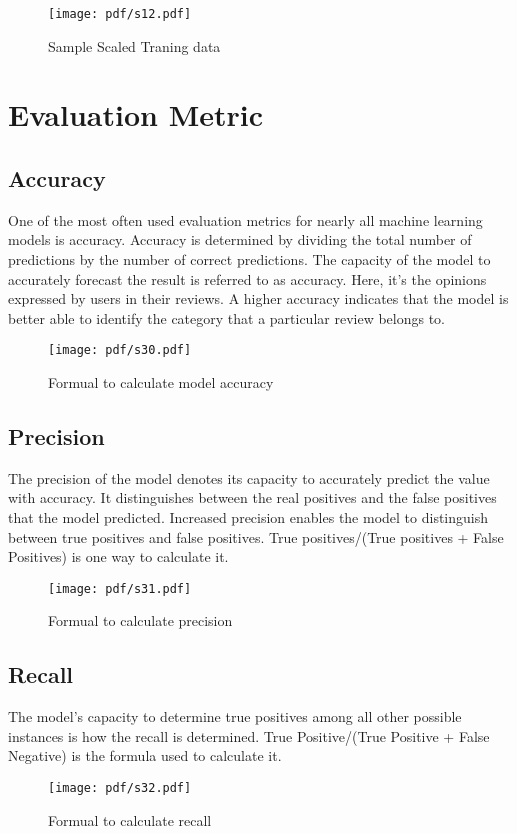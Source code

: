 \begin{figure}[ht!]
  \raggedright
  \texttt{[image: pdf/s12.pdf]}
  \vspace{-10pt}
  \caption{\textbf{ }Sample Scaled Traning data}
\end{figure}

\section{Evaluation Metric} 
\subsection {Accuracy}
One of the most often used evaluation metrics for nearly all machine learning models is accuracy. Accuracy is determined by dividing the total number of predictions by the number of correct predictions. The capacity of the model to accurately forecast the result is referred to as accuracy. Here, it's the opinions expressed by users in their reviews. A higher accuracy indicates that the model is better able to identify the category that a particular review belongs to.
\begin{figure}[ht!]
  \raggedright
  \texttt{[image: pdf/s30.pdf]}
  \vspace{-10pt}
  \caption{\textbf{ }Formual to calculate model accuracy}
\end{figure}
\subsection {Precision}
The precision of the model denotes its capacity to accurately predict the value with accuracy. It distinguishes between the real positives and the false positives that the model predicted. Increased precision enables the model to distinguish between true positives and false positives. True positives/(True positives + False Positives) is one way to calculate it.

\begin{figure}[ht!]
  \raggedright
  \texttt{[image: pdf/s31.pdf]}
  \vspace{-10pt}
  \caption{\textbf{ }Formual to calculate precision}
\end{figure}
\subsection {Recall}
The model's capacity to determine true positives among all other possible instances is how the recall is determined. True Positive/(True Positive + False Negative) is the formula used to calculate it.
\begin{figure}[ht!]
  \raggedright
  \texttt{[image: pdf/s32.pdf]}
  \vspace{-10pt}
  \caption{\textbf{ }Formual to calculate recall}
\end{figure}
